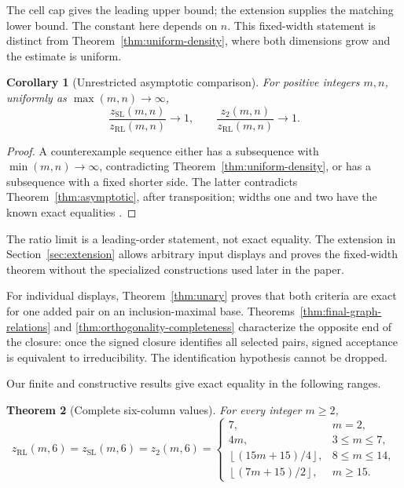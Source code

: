 \documentclass[11pt,a4paper]{article}
\newtheorem{theorem}{Theorem}[section]
\newtheorem{corollary}[theorem]{Corollary}
\theoremstyle{definition}
\newcommand{\zr}{z_{\mathrm{RL}}}
\newcommand{\zs}{z_{\mathrm{SL}}}
\newcommand{\zt}{z_2}
\newcommand{\fl}[1]{\left\lfloor #1\right\rfloor}
\begin{document}
The cell cap gives the leading upper bound; the extension supplies the
matching lower bound. The constant here depends on $n$. This fixed-width
statement is distinct from Theorem~\ref{thm:uniform-density}, where both
dimensions grow and the estimate is uniform.

\begin{corollary}[Unrestricted asymptotic comparison]\label{cor:unrestricted-asymptotic}
For positive integers $m,n$, uniformly as $\max(m,n)\to\infty$,
\[
 \frac{\zs(m,n)}{\zr(m,n)}\longrightarrow1,
 \qquad \frac{\zt(m,n)}{\zr(m,n)}\longrightarrow1.
\]
\end{corollary}
\begin{proof}
A counterexample sequence either has a subsequence with
$\min(m,n)\to\infty$, contradicting Theorem~\ref{thm:uniform-density},
or has a subsequence with a fixed shorter side. The latter contradicts
Theorem~\ref{thm:asymptotic}, after transposition; widths one and two
have the known exact equalities \cite{LQ}.
\end{proof}


The ratio limit is a leading-order statement, not exact equality. The
extension in Section~\ref{sec:extension} allows arbitrary input displays
and proves the fixed-width theorem without the specialized constructions
used later in the paper.

For individual displays, Theorem~\ref{thm:unary} proves that both criteria
are exact for one added pair on an inclusion-maximal base.
Theorems~\ref{thm:final-graph-relations} and
\ref{thm:orthogonality-completeness} characterize the opposite end of the
closure: once the signed closure identifies all selected pairs, signed acceptance is
equivalent to irreducibility. The identification hypothesis cannot be
dropped.

Our finite and constructive results give exact equality in the following
ranges.
\begin{theorem}[Complete six-column values]\label{thm:six}
For every integer $m\ge2$,
\begin{equation}\label{eq:six}
 \zr(m,6)=\zs(m,6)=\zt(m,6)=
 \begin{cases}
 7,&m=2,\\
 4m,&3\le m\le7,\\
 \fl{(15m+15)/4},&8\le m\le14,\\
 \fl{(7m+15)/2},&m\ge15.
 \end{cases}
\end{equation}
\end{theorem}
\end{document}
